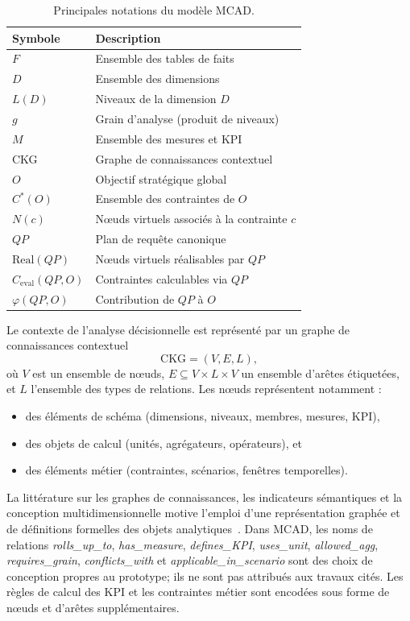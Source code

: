 \documentclass[journal]{IEEEtran}
\begin{document}
\begin{table}[!t]
\centering
\caption{Principales notations du modèle MCAD.}
\begin{tabular}{@{}ll@{}}
\toprule
Symbole & Description \\
\midrule
$F$ & Ensemble des tables de faits \\
$D$ & Ensemble des dimensions \\
$L(D)$ & Niveaux de la dimension $D$ \\
$g$ & Grain d'analyse (produit de niveaux) \\
$M$ & Ensemble des mesures et KPI \\
CKG & Graphe de connaissances contextuel \\
$O$ & Objectif stratégique global \\
$C^*(O)$ & Ensemble des contraintes de $O$ \\
$N(c)$ & Nœuds virtuels associés à la contrainte $c$ \\
$QP$ & Plan de requête canonique \\
$\mathrm{Real}(QP)$ & Nœuds virtuels réalisables par $QP$ \\
$C_{\mathrm{eval}}(QP,O)$ & Contraintes calculables via $QP$ \\
$\varphi(QP,O)$ & Contribution de $QP$ à $O$ \\
\bottomrule
\end{tabular}
\label{tab:notation}
\end{table}

Le contexte de l'analyse décisionnelle est représenté par un graphe de connaissances contextuel
\[
\mathrm{CKG}=(V,E,L),
\]
où $V$ est un ensemble de nœuds, $E\subseteq V\times L\times V$ un ensemble d'arêtes étiquetées, et $L$ l'ensemble des types de relations. Les nœuds représentent notamment :
\begin{itemize}
  \item des éléments de schéma (dimensions, niveaux, membres, mesures, KPI),
  \item des objets de calcul (unités, agrégateurs, opérateurs), et
  \item des éléments métier (contraintes, scénarios, fenêtres temporelles).
\end{itemize}
La littérature sur les graphes de connaissances, les indicateurs sémantiques et la conception multidimensionnelle motive l'emploi d'une représentation graphée et de définitions formelles des objets analytiques~\cite{HoganKGSurvey2021,DiamantiniKPISurvey2025,Niedritis2011,RomeroAbello2010}. Dans MCAD, les noms de relations \textit{rolls\_up\_to}, \textit{has\_measure}, \textit{defines\_KPI}, \textit{uses\_unit}, \textit{allowed\_agg}, \textit{requires\_grain}, \textit{conflicts\_with} et \textit{applicable\_in\_scenario} sont des choix de conception propres au prototype; ils ne sont pas attribués aux travaux cités. Les règles de calcul des KPI et les contraintes métier sont encodées sous forme de nœuds et d'arêtes supplémentaires.
\end{document}
